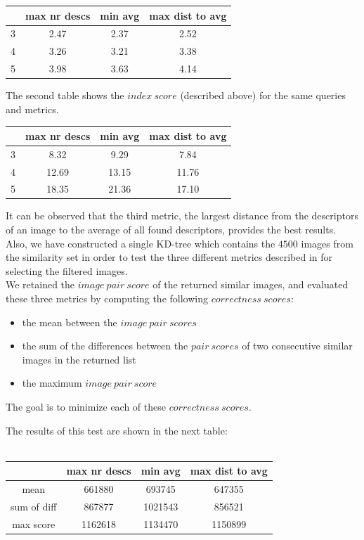 \begin{center}
\begin{tabular} {c | c | c | c}
	& max nr descs & min avg & max dist to avg \\
	\hline
	3 & 2.47 & 2.37 & 2.52 \\
	\hline
	4 & 3.26 & 3.21 & 3.38 \\
	\hline
	5 & 3.98 & 3.63 & 4.14 \\
\end{tabular}
\end{center}

The second table shows the $index\ score$ (described above) for the same queries and metrics.\\

\begin{center}
\begin{tabular} {c | c | c | c}
	& max nr descs & min avg & max dist to avg \\
	\hline
	3 & 8.32 & 9.29 & 7.84 \\
	\hline
	4 & 12.69 & 13.15 & 11.76 \\
	\hline
	5 & 18.35 & 21.36 & 17.10 \\
\end{tabular}
\end{center}

It can be observed that the third metric, the largest distance from the descriptors of an image to the average of all found descriptors, provides the best results.\\

Also, we have constructed a single KD-tree which contains the $4500$ images from the similarity set in order to test the three different metrics described in  for selecting the filtered images.\\
We retained the $image\ pair\ score$ of the returned similar images, and evaluated these three metrics by computing the following $correctness\ scores$:
\begin{itemize}
	\item the mean between the $image\ pair\ scores$
	\item the sum of the differences between the $pair\ scores$ of two consecutive similar images in the returned list
	\item the maximum $image\ pair\ score$
\end{itemize}
The goal is to minimize each of these $correctness\ scores$.

The results of this test are shown in the next table:\\
\\
\begin{center}
\begin{tabular} {c | c | c | c}
	& max nr descs & min avg & max dist to avg \\
	\hline
	mean & 661880 & 693745 & 647355 \\
	\hline
	sum of diff & 867877 & 1021543 & 856521 \\
	\hline
	max score & 1162618 & 1134470 & 1150899 \\
\end{tabular}
\end{center}

